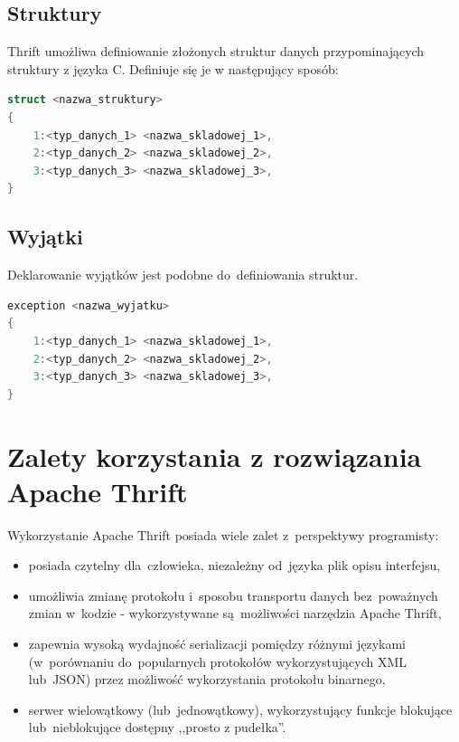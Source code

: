 \subsection[Struktury][Struktury]{Struktury}
Thrift umożliwa definiowanie złożonych struktur danych przypominających
struktury z języka C. Definiuje się je w następujący sposób:
\begin{lstlisting}[language=C, style=incode]
struct <nazwa_struktury>
{
	1:<typ_danych_1> <nazwa_skladowej_1>,
	2:<typ_danych_2> <nazwa_skladowej_2>,
	3:<typ_danych_3> <nazwa_skladowej_3>,
}
\end{lstlisting}

\subsection[Wyjątki][Wyjątki]{Wyjątki}
Deklarowanie wyjątków jest podobne do~definiowania struktur.

\begin{lstlisting}[language=C, style=incode, morekeywords={exception}]
exception <nazwa_wyjatku>
{
	1:<typ_danych_1> <nazwa_skladowej_1>,
	2:<typ_danych_2> <nazwa_skladowej_2>,
	3:<typ_danych_3> <nazwa_skladowej_3>,
}
\end{lstlisting}

\newpage
\section[Zalety korzystania z rozwiązania Apache Thrift][Zalety korzystania z
rozwiązania Apache Thrift]{Zalety korzystania z rozwiązania Apache Thrift}
Wykorzystanie Apache Thrift posiada wiele zalet z~perspektywy programisty:
\begin{itemize}
  \item posiada czytelny dla~człowieka, niezależny od~języka plik opisu
  interfejsu,
  \item umożliwia zmianę protokołu i~sposobu transportu danych bez~poważnych
  zmian w~kodzie - wykorzystywane są~możliwości narzędzia Apache Thrift,
  \item zapewnia wysoką wydajność serializacji pomiędzy różnymi językami
  (w~porównaniu do~popularnych protokołów wykorzystujących XML lub~JSON) przez
  możliwość wykorzystania protokołu binarnego,
  \item serwer wielowątkowy (lub~jednowątkowy), wykorzystujący funkcje blokujące
  lub~nieblokujące dostępny ,,prosto z pudełka''.
\end{itemize}

